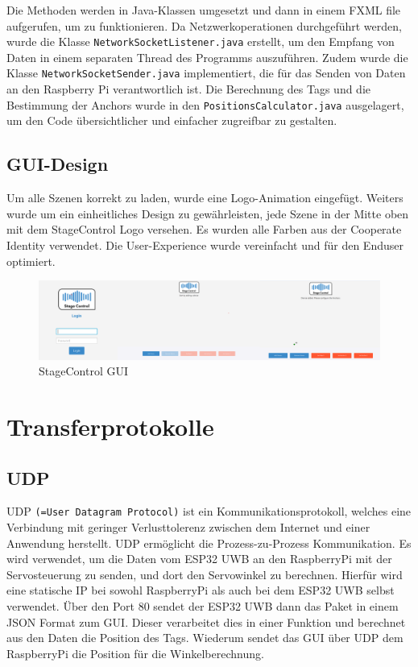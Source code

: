 Die Methoden werden in Java-Klassen umgesetzt und dann in einem FXML file aufgerufen, um zu funktionieren. Da Netzwerkoperationen durchgeführt werden, wurde die Klasse \texttt{NetworkSocketListener.java} erstellt, um den Empfang von Daten in einem separaten Thread des Programms auszuführen. Zudem wurde die Klasse \texttt{NetworkSocketSender.java} implementiert, die für das Senden von Daten an den Raspberry Pi verantwortlich ist. Die Berechnung des Tags und die Bestimmung der Anchors wurde in den \texttt{PositionsCalculator.java} ausgelagert, um den Code übersichtlicher und einfacher zugreifbar zu gestalten. 

\newpage
\subsection{GUI-Design}
Um alle Szenen korrekt zu laden, wurde eine Logo-Animation eingefügt. Weiters wurde um ein einheitliches Design zu gewährleisten, jede Szene in der Mitte oben mit dem StageControl Logo versehen. Es wurden alle Farben aus der Cooperate Identity verwendet. Die User-Experience wurde vereinfacht und für den Enduser optimiert.   

\begin{figure}[H]
	\centering
	\includegraphics[width=0.9\linewidth]{images/stagecontrol.png}
	\caption[StageControl GUI]{StageControl GUI}
	\label{fig:StageControlGUI}
\end{figure}

\section{Transferprotokolle}

\subsection{UDP}
UDP \texttt{(=User Datagram Protocol)} ist ein Kommunikationsprotokoll, welches eine Verbindung mit geringer Verlusttolerenz zwischen dem Internet und einer Anwendung herstellt. UDP ermöglicht die Prozess-zu-Prozess Kommunikation. Es wird verwendet, um die Daten vom ESP32 UWB an den RaspberryPi mit der Servosteuerung zu senden, und dort den Servowinkel zu berechnen. Hierfür wird eine statische IP bei sowohl RaspberryPi als auch bei dem ESP32 UWB selbst verwendet. Über den Port 80 sendet der ESP32 UWB dann das Paket in einem JSON Format zum GUI. Dieser verarbeitet dies in einer Funktion und berechnet aus den Daten die Position des Tags. Wiederum sendet das GUI über UDP dem RaspberryPi die Position für die Winkelberechnung. \parencite{UDP}

